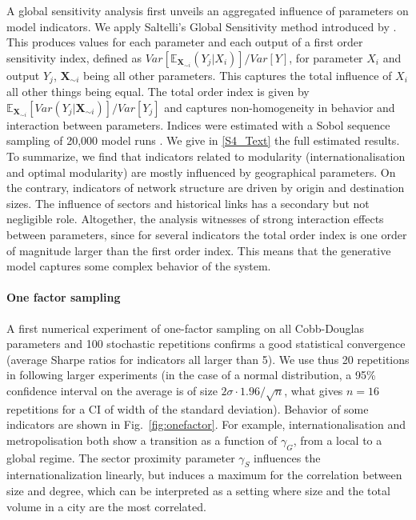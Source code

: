 \documentclass[10pt,letterpaper]{article}
\begin{document}
A global sensitivity analysis first unveils an aggregated influence of parameters on model indicators. We apply Saltelli's Global Sensitivity method introduced by \cite{saltelli2008global}. This produces values for each parameter and each output of a first order sensitivity index, defined as $Var\left[\mathbb{E}_{\mathbf{X}_{\sim i}}\left(Y_j | X_i\right)\right] / Var\left[Y\right]$, for parameter $X_i$ and output $Y_j$, $\mathbf{X}_{\sim i}$ being all other parameters. This captures the total influence of $X_i$ all other things being equal. The total order index is given by $\mathbb{E}_{\mathbf{X}_{\sim i}} \left[Var(Y_j | \mathbf{X}_{\sim i})\right] / Var\left[Y_j\right]$ and captures non-homogeneity in behavior and interaction between parameters. Indices were estimated with a Sobol sequence sampling of 20,000 model runs \cite{saltelli2010variance}. We give in \ref{S4_Text} the full estimated results. To summarize, we find that indicators related to modularity (internationalisation and optimal modularity) are mostly influenced by geographical parameters. On the contrary, indicators of network structure are driven by origin and destination sizes. The influence of sectors and historical links has a secondary but not negligible role. Altogether, the analysis witnesses of strong interaction effects between parameters, since for several indicators the total order index is one order of magnitude larger than the first order index. This means that the generative model captures some complex behavior of the system. %



\paragraph{One factor sampling}

A first numerical experiment of one-factor sampling on all Cobb-Douglas parameters and 100 stochastic repetitions confirms a good statistical convergence (average Sharpe ratios for indicators all larger than 5). We use thus 20 repetitions in following larger experiments (in the case of a normal distribution, a 95\% confidence interval on the average is of size $2\sigma \cdot 1.96 / \sqrt{n}$, what gives $n=16$ repetitions for a CI of width of the standard deviation). Behavior of some indicators are shown in Fig.~\ref{fig:onefactor}. For example, internationalisation and metropolisation both show a transition as a function of $\gamma_G$, from a local to a global regime. The sector proximity parameter $\gamma_S$ influences the internationalization linearly, but induces a maximum for the correlation between size and degree, which can be interpreted as a setting where size and the total volume in a city are the most correlated.
\end{document}
